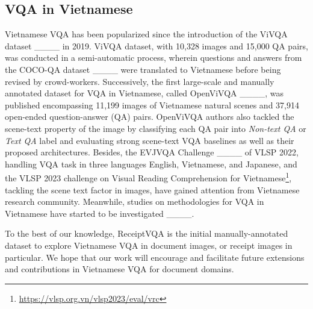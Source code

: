 
\subsection{VQA in Vietnamese} \label{sec:rel_vqavi}

Vietnamese VQA has been popularized since the introduction of the ViVQA dataset ____ in 2019. ViVQA dataset, with 10,328 images and 15,000 QA pairs, was conducted in a semi-automatic process, wherein questions and answers from the COCO-QA dataset ____ were translated to Vietnamese before being revised by crowd-workers. Successively, the first large-scale and manually annotated dataset for VQA in Vietnamese, called OpenViVQA ____, was published encompassing 11,199 images of Vietnamese natural scenes and 37,914 open-ended question-answer (QA) pairs. OpenViVQA authors also tackled the scene-text property of the image by classifying each QA pair into \textit{Non-text QA} or \textit{Text QA} label and evaluating strong scene-text VQA baselines as well as their proposed architectures. Besides, the EVJVQA Challenge ____ of VLSP 2022, handling VQA task in three languages English, Vietnamese, and Japanese, and the VLSP 2023 challenge on Visual Reading Comprehension for Vietnamese\footnote{\url{https://vlsp.org.vn/vlsp2023/eval/vrc}}, tackling the scene text factor in images, have gained attention from Vietnamese research community. Meanwhile, studies on methodologies for VQA in Vietnamese have started to be investigated ____.

To the best of our knowledge, ReceiptVQA is the initial manually-annotated dataset to explore Vietnamese VQA in document images, or receipt images in particular. We hope that our work will encourage and facilitate future extensions and contributions in Vietnamese VQA for document domains. 

